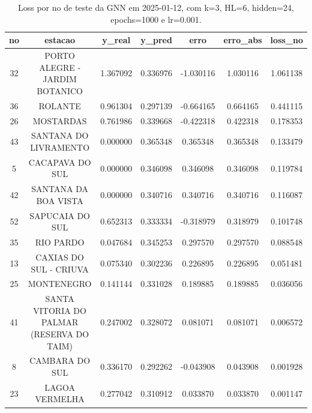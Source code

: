 \begin{table}[h]
\centering
\caption{Loss por no de teste da GNN em 2025-01-12, com k=3, HL=6, hidden=24, epochs=1000 e lr=0.001.}
\label{tab:gnn_loss_k3_hl6_h24_e1000_d20250112}
\begin{tabular}{ccccccc}
\toprule
no & estacao & y\_real & y\_pred & erro & erro\_abs & loss\_no \\
\midrule
32 & PORTO ALEGRE - JARDIM BOTANICO & 1.367092 & 0.336976 & -1.030116 & 1.030116 & 1.061138 \\
36 & ROLANTE & 0.961304 & 0.297139 & -0.664165 & 0.664165 & 0.441115 \\
26 & MOSTARDAS & 0.761986 & 0.339668 & -0.422318 & 0.422318 & 0.178353 \\
43 & SANTANA DO LIVRAMENTO & 0.000000 & 0.365348 & 0.365348 & 0.365348 & 0.133479 \\
5 & CACAPAVA DO SUL & 0.000000 & 0.346098 & 0.346098 & 0.346098 & 0.119784 \\
42 & SANTANA DA BOA VISTA & 0.000000 & 0.340716 & 0.340716 & 0.340716 & 0.116087 \\
52 & SAPUCAIA DO SUL & 0.652313 & 0.333334 & -0.318979 & 0.318979 & 0.101748 \\
35 & RIO PARDO & 0.047684 & 0.345253 & 0.297570 & 0.297570 & 0.088548 \\
13 & CAXIAS DO SUL - CRIUVA & 0.075340 & 0.302236 & 0.226895 & 0.226895 & 0.051481 \\
25 & MONTENEGRO & 0.141144 & 0.331028 & 0.189885 & 0.189885 & 0.036056 \\
41 & SANTA VITORIA DO PALMAR (RESERVA DO TAIM) & 0.247002 & 0.328072 & 0.081071 & 0.081071 & 0.006572 \\
8 & CAMBARA DO SUL & 0.336170 & 0.292262 & -0.043908 & 0.043908 & 0.001928 \\
23 & LAGOA VERMELHA & 0.277042 & 0.310912 & 0.033870 & 0.033870 & 0.001147 \\
\bottomrule
\end{tabular}
\end{table}
